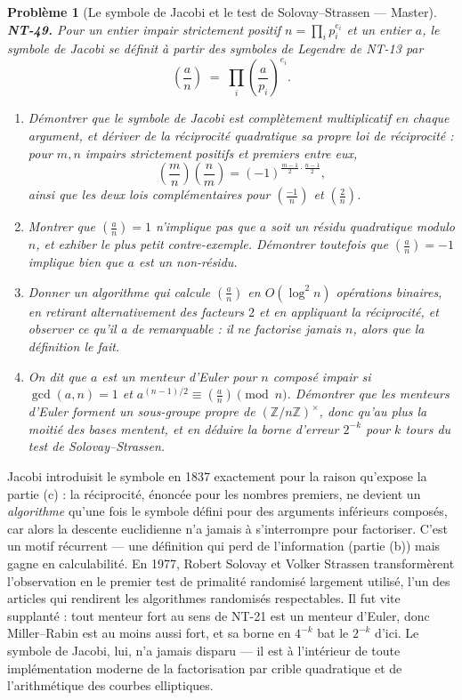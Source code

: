 \documentclass[11pt]{article}
\newtheorem{problem}{Problème}
\begin{document}
\bigskip

\begin{problem}[{Le symbole de Jacobi et le test de Solovay--Strassen --- Master}]
\textbf{NT-49.} Pour un entier impair strictement positif $ n = \prod_i p_i^{e_i} $ et un
entier $ a $, le symbole de Jacobi se définit à partir des symboles de Legendre de NT-13 par
\[ \left(\frac{a}{n}\right) \;=\; \prod_i \left(\frac{a}{p_i}\right)^{e_i}. \]
\begin{enumerate}
\item[(a)] Démontrer que le symbole de Jacobi est complètement multiplicatif en chaque argument, et dériver
de la réciprocité quadratique sa propre loi de réciprocité : pour $ m, n $ impairs strictement
positifs et premiers entre eux,
\[ \left(\frac{m}{n}\right)\left(\frac{n}{m}\right) = (-1)^{\frac{m-1}{2}\cdot\frac{n-1}{2}}, \]
ainsi que les deux lois complémentaires pour $ \left(\frac{-1}{n}\right) $ et
$ \left(\frac{2}{n}\right) $.
\item[(b)] Montrer que $ \left(\frac{a}{n}\right) = 1 $ n'implique \textit{pas} que $ a $ soit un
résidu quadratique modulo $ n $, et exhiber le plus petit contre-exemple. Démontrer toutefois
que $ \left(\frac{a}{n}\right) = -1 $ implique bien que $ a $ est un non-résidu.
\item[(c)] Donner un algorithme qui calcule $ \left(\frac{a}{n}\right) $ en $ O(\log^2 n) $ opérations
binaires, en retirant alternativement des facteurs $ 2 $ et en appliquant la réciprocité, et
observer ce qu'il a de remarquable : il ne factorise jamais $ n $, alors que la définition le
fait.
\item[(d)] On dit que $ a $ est un \textit{menteur d'Euler} pour $ n $ composé impair si $ \gcd(a,n) = 1 $ et
$ a^{(n-1)/2} \equiv \left(\frac{a}{n}\right) \pmod n $. Démontrer que les menteurs d'Euler forment
un sous-groupe propre de $ (\mathbb{Z}/n\mathbb{Z})^{\times} $, donc qu'au plus la moitié des bases
mentent, et en déduire la borne d'erreur $ 2^{-k} $ pour $ k $ tours du test de
Solovay--Strassen.
\end{enumerate}

\end{problem}

\noindent Jacobi introduisit le symbole en 1837 exactement pour la raison qu'expose la
partie (c) : la réciprocité, énoncée pour les nombres premiers, ne devient un \textit{algorithme} qu'une
fois le symbole défini pour des arguments inférieurs composés, car alors la descente euclidienne n'a
jamais à s'interrompre pour factoriser. C'est un motif récurrent --- une définition qui perd de
l'information (partie (b)) mais gagne en calculabilité. En 1977, Robert Solovay et Volker Strassen
transformèrent l'observation en le premier test de primalité randomisé largement utilisé, l'un des
articles qui rendirent les algorithmes randomisés respectables. Il fut vite supplanté : tout menteur
fort au sens de NT-21 est un menteur d'Euler, donc Miller--Rabin est au moins aussi fort, et sa borne
en $ 4^{-k} $ bat le $ 2^{-k} $ d'ici. Le symbole de Jacobi, lui, n'a jamais disparu --- il est à
l'intérieur de toute implémentation moderne de la factorisation par crible quadratique et de
l'arithmétique des courbes elliptiques.
\end{document}
